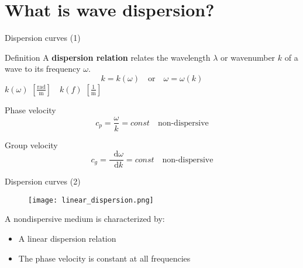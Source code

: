 \documentclass[10pt,aspectratio=169,notes]{beamer} %
\DeclareRobustCommand*{\drv}{\mathop{}\!\mathrm{d}}
\begin{document}
\section{What is wave dispersion?}
\begin{frame}{Dispersion curves (1)}
	\begin{alertblock}{Definition}
		A \textbf{dispersion relation} relates the wavelength $\lambda$ or wavenumber $k$ of a wave to its frequency $\omega$.\\
		\begin{equation*}
		\boxed{k=k(\omega)} \quad \textrm{or} \quad \boxed{\omega = \omega(k)}
		\end{equation*}
		\vspace{10pt}
		$k(\omega)$ $[\frac{\mathrm{rad}}{\mathrm{m}}] \quad k(f)$ $[\frac{1}{\mathrm{m}}]$
	\end{alertblock}
	\begin{block}{Phase velocity}
		\begin{equation*}
		c_p = \frac{\omega}{k} = const\quad \textrm{non-dispersive}
		\end{equation*}
	\end{block}
	\begin{block}{Group velocity}
		\begin{equation*}
		c_g = \frac{\drv \omega}{\drv k} = const \quad \textrm{non-dispersive}
		\end{equation*}
	\end{block}
\end{frame}
\begin{frame}{Dispersion curves (2)}
	\begin{figure}
		\texttt{[image: linear\_dispersion.png]}
	\end{figure}
A nondispersive medium is characterized by:
	\begin{itemize}
	\item A linear dispersion relation
	\item The phase velocity is constant at all frequencies
	\end{itemize}
\end{frame}
\end{document}
